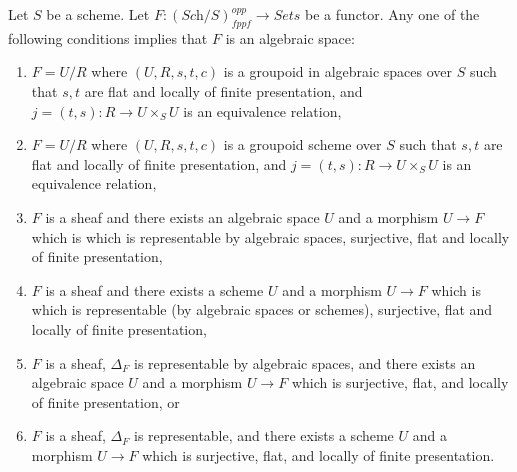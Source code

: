 \begin{theorem}
\label{theorem-final-bootstrap}
Let $S$ be a scheme.
Let $F : (\textit{Sch}/S)_{fppf}^{opp} \to \textit{Sets}$ be a functor.
Any one of the following conditions implies that $F$ is an algebraic space:
\begin{enumerate}
\item $F = U/R$ where $(U, R, s, t, c)$ is a groupoid in algebraic spaces
over $S$ such that $s, t$ are flat and locally of finite presentation, and
$j = (t, s) : R \to U \times_S U$ is an equivalence relation,
\item $F = U/R$ where $(U, R, s, t, c)$ is a groupoid scheme
over $S$ such that $s, t$ are flat and locally of finite presentation, and
$j = (t, s) : R \to U \times_S U$ is an equivalence relation,
\item $F$ is a sheaf and there exists an algebraic space $U$ and a morphism
$U \to F$ which is which is representable by algebraic spaces,
surjective, flat and locally of finite presentation,
\item $F$ is a sheaf and there exists a scheme $U$ and a morphism
$U \to F$ which is which is representable (by algebraic spaces or schemes),
surjective, flat and locally of finite presentation,
\item $F$ is a sheaf, $\Delta_F$ is representable by algebraic spaces,
and there exists an algebraic space $U$ and a morphism $U \to F$ which is
surjective, flat, and locally of finite presentation, or
\item $F$ is a sheaf, $\Delta_F$ is representable,
and there exists a scheme $U$ and a morphism $U \to F$ which is
surjective, flat, and locally of finite presentation.
\end{enumerate}
\end{theorem}

